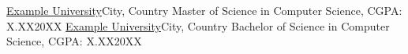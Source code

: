   \customSubHeadingContentStart
    \customSubHeading
      {\href{https://www.example.edu/}{Example University}}{City, Country}
    \customRoleHeading
      {Master of Science in Computer Science, CGPA: X.XX}{20XX}
    \vspace{-10pt}
    \customSubHeading
      {\href{https://www.example.edu/}{Example University}}{City, Country}
    \customRoleHeading
      {Bachelor of Science in Computer Science, CGPA: X.XX}{20XX}
  \customSubHeadingContentEnd
\vspace{-8pt}